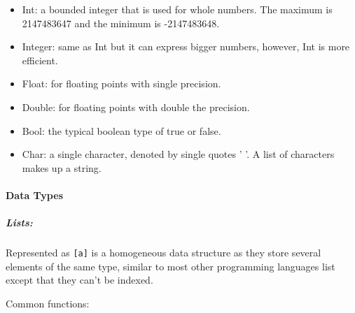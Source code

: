 \documentclass{article}
\begin{document}
\begin{itemize}
\item Int: a bounded integer that is used for whole numbers. The maximum is 2147483647 and the minimum is -2147483648.

\item Integer: same as Int but it can express bigger numbers, however, Int is more efficient.

\item Float: for floating points with single precision.

\item Double: for floating points with double the precision. 

\item Bool: the typical boolean type of true or false.

\item Char: a single character, denoted by single quotes ' '. A list of characters makes up a string. 
\end{itemize}

\paragraph {Data Types}

\subparagraph{Lists:}  

Represented as \lstinline{[a]} is a homogeneous data structure as they store several elements of the same type, similar to most other programming languages list except that they can't be indexed. 

Common functions:
\end{document}
